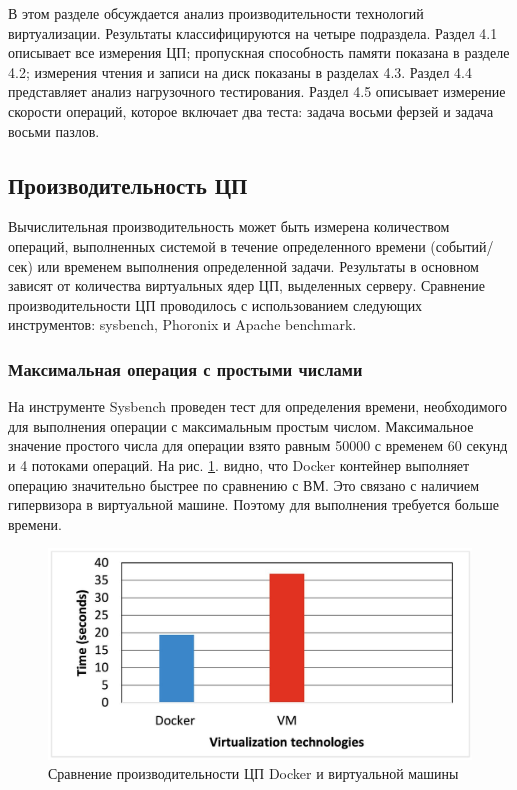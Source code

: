 \documentclass{mirea}
\begin{document}
	В этом разделе обсуждается анализ производительности технологий виртуализации. Результаты классифицируются на четыре подраздела. Раздел 4.1 описывает все измерения ЦП; пропускная способность памяти показана в разделе 4.2; измерения чтения и записи на диск показаны в разделах 4.3. Раздел 4.4 представляет анализ нагрузочного тестирования. Раздел 4.5 описывает измерение скорости операций, которое включает два теста: задача восьми ферзей и задача восьми пазлов.
	
	\subsection{Производительность ЦП}
	
	Вычислительная производительность может быть измерена количеством операций, выполненных системой в течение определенного времени (событий/сек) или временем выполнения определенной задачи. Результаты в основном зависят от количества виртуальных ядер ЦП, выделенных серверу. Сравнение производительности ЦП проводилось с использованием следующих инструментов: sysbench, Phoronix и Apache benchmark.
	
	\subsubsection{Максимальная операция с простыми числами}
	
	На инструменте Sysbench проведен тест для определения времени, необходимого для выполнения операции с максимальным простым числом. Максимальное значение простого числа для операции взято равным 50000 с временем 60 секунд и 4 потоками операций. На рис. \ref{fig:pic4}. видно, что Docker контейнер выполняет операцию значительно быстрее по сравнению с ВМ. Это связано с наличием гипервизора в виртуальной машине. Поэтому для выполнения требуется больше времени.
	
	\begin{figure}[H]
		\centering
		\includegraphics[width=.6\textwidth]{img4}
		\parskip=6pt
		\caption{Сравнение производительности ЦП Docker и виртуальной машины}
		\label{fig:pic4}
	\end{figure}
\end{document}
